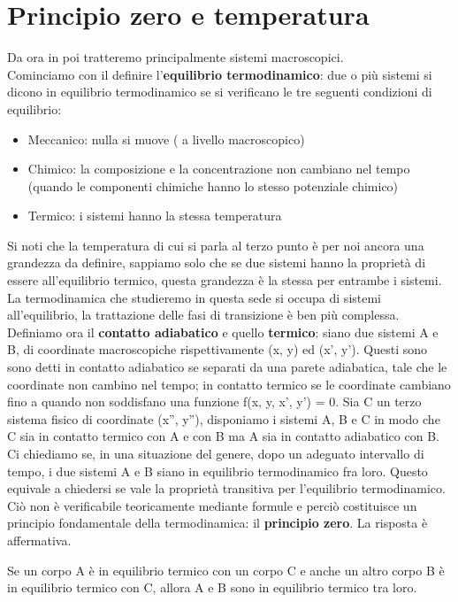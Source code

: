 \documentclass[
10pt, %
a4paper, %
oneside, %
headinclude,footinclude, %
BCOR5mm, %
]{scrartcl}
\begin{document}
\section{Principio zero e temperatura}
Da ora in poi tratteremo principalmente sistemi macroscopici.\\
Cominciamo con il definire l'\textbf{equilibrio termodinamico}: due o più sistemi si dicono in equilibrio termodinamico se si verificano le tre seguenti condizioni di equilibrio:
\begin{itemize}
	\item Meccanico: nulla si muove ( a livello macroscopico)
	\item Chimico: la composizione e la concentrazione non cambiano nel tempo (quando le componenti chimiche hanno lo stesso potenziale chimico)
	\item Termico: i sistemi hanno la stessa temperatura
\end{itemize}	
Si noti che la temperatura di cui si parla al terzo punto è per noi ancora una grandezza da definire, sappiamo solo che se due sistemi hanno la proprietà di essere all'equilibrio termico, questa grandezza è la stessa per entrambe i sistemi. La termodinamica che studieremo in questa sede si occupa di sistemi all'equilibrio, la trattazione delle fasi di transizione è ben più complessa.\\
Definiamo ora il \textbf{contatto adiabatico} e quello \textbf{termico}:
siano due sistemi A e B, di coordinate macroscopiche rispettivamente (x, y) ed (x', y'). Questi sono sono detti in contatto adiabatico se separati da una parete adiabatica, tale che le coordinate non cambino nel tempo; in contatto termico se le coordinate cambiano fino a quando non soddisfano una funzione f(x, y, x', y') = 0. Sia C un terzo sistema fisico di coordinate (x'', y''), disponiamo i sistemi A, B e C in modo che C sia in contatto termico con A e con B ma A sia in contatto adiabatico con B. Ci chiediamo se, in una situazione del genere, dopo un adeguato intervallo di tempo, i due sistemi A e B siano in equilibrio termodinamico fra loro. Questo equivale a chiedersi se vale la proprietà transitiva per l'equilibrio termodinamico. Ciò non è verificabile teoricamente mediante formule e perciò costituisce un principio fondamentale della termodinamica: il \textbf{principio zero}. La risposta è affermativa.
\begin{definition}
	Se un corpo A è in equilibrio termico con un corpo C e anche un altro corpo B è in equilibrio termico con C, allora A e B sono in equilibrio termico tra loro.
\end{definition}
\end{document}
